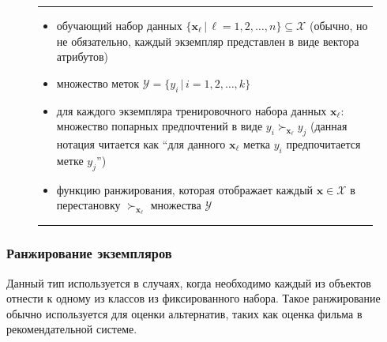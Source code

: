 	\begin{figure}[h!]
		\hrule
		\begin{description}[nosep]
			\item[Дано:] \null\leavevmode
			\begin{itemize}[itemsep=0pt,leftmargin=2ex,label=\textbf{---}]
				\item обучающий набор данных $\{\bm{x}_\ell \, | \, \ell = 1,2,\dotsc,n\} \subseteq \mathcal{X} $ (обычно, но не обязательно, каждый экземпляр представлен в виде вектора атрибутов)
				\item множество меток $\mathcal{Y} = \{y_i\,|\,i = 1,2,\dotsc,k\}$
				\item для каждого экземпляра тренировочного набора данных $\bm{x}_\ell$: множество попарных предпочтений в виде $y_i \succ_{\bm{x}_\ell} y_j $ (данная нотация читается как ``для данного $\bm{x}_\ell$  метка $y_i$ предпочитается метке $y_j$'')
			\end{itemize}
			\item[Найти:] \null\leavevmode
			\begin{itemize}[itemsep=0pt,leftmargin=2ex,label=\textbf{---}]
				\item функцию ранжирования, которая отображает каждый $\bm{x} \in \mathcal{X}$ в перестановку $\succ_{\bm{x}_\ell}$ множества $\mathcal{Y}$
			\end{itemize}
		\end{description} 
		\hrule
		\label{fig:label_ranking}
	\end{figure}
	
	\subsubsection{Ранжирование экземпляров}
	Данный тип используется в случаях, когда необходимо каждый из объектов отнести к одному из классов из фиксированного набора. Такое ранжирование обычно используется для оценки альтернатив, таких как оценка фильма в рекомендательной системе.
	
